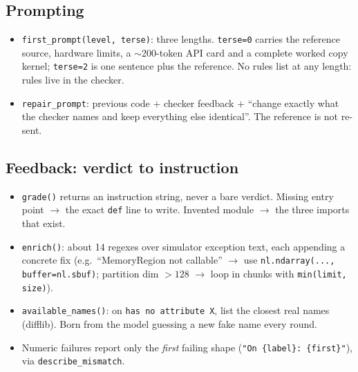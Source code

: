 \documentclass[11pt]{article}
\newcommand{\code}[1]{\texttt{#1}}
\begin{document}
\subsection{Prompting}
\begin{itemize}
  \item \code{first\_prompt(level, terse)}: three lengths. \code{terse=0} carries the reference
        source, hardware limits, a $\sim$200-token API card and a complete worked copy kernel;
        \code{terse=2} is one sentence plus the reference. No rules list at any length: rules live
        in the checker.
  \item \code{repair\_prompt}: previous code + checker feedback + ``change exactly what the
        checker names and keep everything else identical''. The reference is not re-sent.
\end{itemize}

\subsection{Feedback: verdict to instruction}
\begin{itemize}
  \item \code{grade()} returns an instruction string, never a bare verdict. Missing entry point
        $\to$ the exact \code{def} line to write. Invented module $\to$ the three imports that
        exist.
  \item \code{enrich()}: about 14 regexes over simulator exception text, each appending a concrete
        fix (e.g.\ ``MemoryRegion not callable'' $\to$ use
        \code{nl.ndarray(..., buffer=nl.sbuf)}; partition dim $>128$ $\to$ loop in chunks with
        \code{min(limit, size)}).
  \item \code{available\_names()}: on \code{has no attribute X}, list the closest real names
        (difflib). Born from the model guessing a new fake name every round.
  \item Numeric failures report only the \emph{first} failing shape (\code{"On \{label\}:
        \{first\}"}), via \code{describe\_mismatch}.
\end{itemize}
\end{document}

